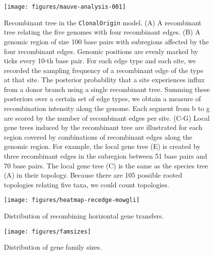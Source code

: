 \documentclass[english]{article}
\begin{document}
\begin{figure}
\texttt{[image: figures/mauve-analysis-001]}
\caption{\label{fig:clonalorigin}Recombinant tree in the \texttt{ClonalOrigin} model.
(A) A recombinant tree relating the five genomes with four recombinant edges.
(B) A genomic region of size 100 base pairs with subregions affected by the
four recombinant edges. Genomic positions are evenly marked by ticks every 10-th
base pair.  For each edge type and each site, we recorded the sampling frequency
of a recombinant edge of the type at that site.  The posterior probability that
a site experiences influx from a donor branch using a single recombinant tree.
Summing these posteriors over a certain set of edge types, we obtain a measure
of recombination intensity along the genome.  Each segment from b to g are
scored by the number of recombinant edges per site.  (C-G) Local gene trees
induced by the recombinant tree are illustrated for each region covered by
combinations of recombinant edges along the genomic region. For example, the
local gene tree (E) is created by three recombinant edges in the subregion
between 51 base pairs and 70 base pairs. The local gene tree (C) is the same as
the species tree (A) in their topology.  Because there are 105 possible rooted
topologies relating five taxa, we could count topologies.}
\end{figure}
\clearpage{}%

\begin{figure}
\begin{center}
\texttt{[image: figures/heatmap-recedge-mowgli]}
\end{center}
\caption{\label{fig:mowgli-recomb-heatmap}Distribution of recombining horizontal
gene transfers.}
\end{figure}
\clearpage{}

\begin{figure}
\begin{center}
\texttt{[image: figures/famsizes]}
\end{center}
\caption{\label{fig:famsizes}Distribution of gene family sizes.}
\end{figure}
\clearpage{}
\end{document}
